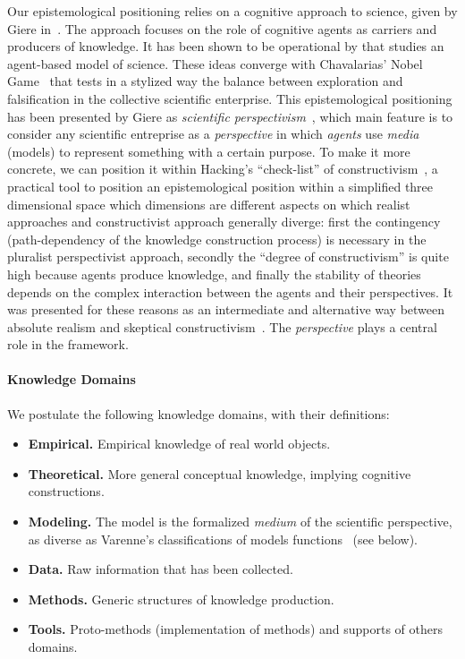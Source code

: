 \documentclass[runningheads,a4paper]{llncs2e/llncs}
\begin{document}
Our epistemological positioning relies on a cognitive approach to science, given by Giere in~\cite{giere2010explaining}. The approach focuses on the role of cognitive agents as carriers and producers of knowledge. It has been shown to be operational by \cite{giere2010agent} that studies an agent-based model of science. These ideas converge with Chavalarias' Nobel Game~\cite{chavalarias2016s} that tests in a stylized way the balance between exploration and falsification in the collective scientific enterprise. This epistemological positioning has been presented by Giere as \emph{scientific perspectivism}~\cite{giere2010scientific}, which main feature is to consider any scientific entreprise as a \emph{perspective} in which \emph{agents} use \emph{media} (models) to represent something with a certain purpose. To make it more concrete, we can position it within Hacking's ``check-list'' of constructivism~\cite{hacking1999social}, a practical tool to position an epistemological position within a simplified three dimensional space which dimensions are different aspects on which realist approaches and constructivist approach generally diverge: first the contingency (path-dependency of the knowledge construction process) is necessary in the pluralist perspectivist approach, secondly the ``degree of constructivism'' is quite high because agents produce knowledge, and finally the stability of theories depends on the complex interaction between the agents and their perspectives. It was presented for these reasons as an intermediate and alternative way between absolute realism and skeptical constructivism~\cite{brown2009models}. The \emph{perspective} plays a central role in the framework.


\paragraph{Knowledge Domains}

We postulate the following knowledge domains, with their definitions:
\begin{itemize}
\item \textbf{Empirical.} Empirical knowledge of real world objects.
\item \textbf{Theoretical.} More general conceptual knowledge, implying cognitive constructions. %
\item \textbf{Modeling.} The model is the formalized \emph{medium} of the scientific perspective, as diverse as Varenne's classifications of models functions~\cite{varenne2010simulations} (see below).
\item \textbf{Data.} Raw information that has been collected.
\item \textbf{Methods.} Generic structures of knowledge production.
\item \textbf{Tools.} Proto-methods (implementation of methods) and supports of others domains.
\end{itemize}
\end{document}
